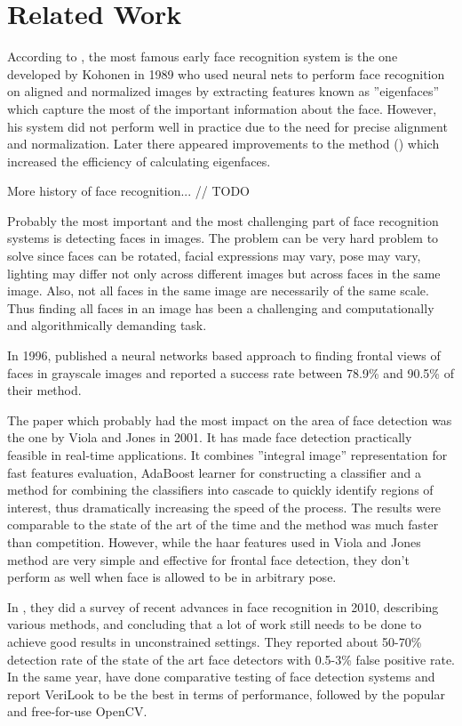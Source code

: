 \documentclass[11pt, draftclsnofoot, onecolumn]{IEEEtran}
\begin{document}
\section{Related Work} \label{sec:related}

According to \cite{MIT2000}, the most famous early face recognition system is the one developed by Kohonen in 1989 who used neural nets to perform face recognition on aligned and normalized images by extracting features known as ''eigenfaces'' which capture the most of the important information about the face. However, his system did not perform well in practice due to the need for precise alignment and normalization. Later there appeared improvements to the method (\cite{IEEE1990}) which increased the efficiency of calculating eigenfaces.

More history of face recognition... // TODO

Probably the most important and the most challenging part of face recognition systems is detecting faces in images. The problem can be very hard problem to solve since faces can be rotated, facial expressions may vary, pose may vary, lighting may differ not only across different images but across faces in the same image. Also, not all faces in the same image are necessarily of the same scale. Thus finding all faces in an image has been a challenging and computationally and algorithmically demanding task.

In 1996, \cite{CVPR1996} published a neural networks based approach to finding frontal views of faces in grayscale images and reported a success rate between 78.9\% and 90.5\% of their method.

The paper which probably had the most impact on the area of face detection was the one by Viola and Jones \cite{IWSCTV2001} in 2001. It has made face detection practically feasible in real-time applications. It combines ''integral image'' representation for fast features evaluation, AdaBoost learner for constructing a classifier and a method for combining the classifiers into cascade to quickly identify regions of interest, thus dramatically increasing the speed of the process. The results were comparable to the state of the art of the time and the method was much faster than competition. However, while the haar features used in Viola and Jones method are very simple and effective for frontal face detection, they don't perform as well when face is allowed to be in arbitrary pose. 

In \cite{MSR2010}, they did a survey of recent advances in face recognition in 2010, describing various methods, and concluding that a lot of work still needs to be done to achieve good results in unconstrained settings. They reported about 50-70\% detection rate of the state of the art face detectors with 0.5-3\% false positive rate. In the same year, \cite{TSU2010} have done comparative testing of face detection systems and report VeriLook to be the best in terms of performance, followed by the popular and free-for-use OpenCV.
\end{document}
